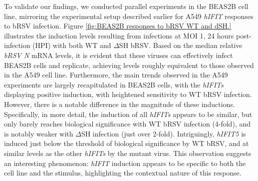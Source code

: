 To validate our findings, we conducted parallel experiments in the BEAS2B cell line, mirroring the experimental setup described earlier for A549 \textit{hIFIT} responses to bRSV infection. Figure \ref{fig:BEAS2B responses to bRSV WT and dSH.} illustrates the induction levels resulting from infections at MOI 1, 24 hours post-infection (HPI) with both WT and \(\Delta\)SH bRSV. Based on the median relative \textit{bRSV N} mRNA levels, it is evident that these viruses can effectively infect BEAS2B cells and replicate, achieving levels roughly equivalent to those observed in the A549 cell line. Furthermore, the main trends observed in the A549 experiments are largely recapitulated in BEAS2B cells, with the \textit{hIFITs} displaying positive induction, with heightened sensitivity to WT bRSV infection. However, there is a notable difference in the magnitude of these inductions. Specifically, in more detail, the induction of all \textit{hIFITs} appears to be similar, but only barely reaches biological significance with WT bRSV infection (4-fold), and is notably weaker with \(\Delta\)SH infection (just over 2-fold). Intriguingly, \textit{hIFIT5} is induced just below the threshold of biological significance by WT bRSV, and at similar levels as the other \textit{hIFITs} by the mutant virus. This observation suggests an interesting phenomenon: \textit{hIFIT} induction appears to be specific to both the cell line and the stimulus, highlighting the contextual nature of this response.

